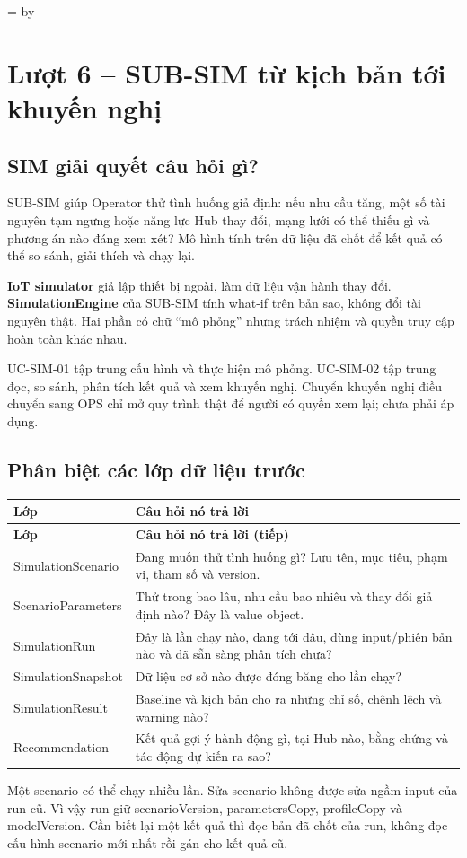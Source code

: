 \documentclass[12pt,a4paper]{article}
\newcommand{\Needspace}[1]{%
  \par\begingroup\dimen0=\pagegoal\advance\dimen0 by -\pagetotal
  \ifdim\dimen0<#1\relax\newpage\fi\endgroup}
\newcommand{\Lesson}[1]{\par\bigskip\Needspace{0.52\textheight}\section{#1}}
\newcommand{\Term}[1]{\textbf{#1}}
\newenvironment{PairTable}[2]{%
  \begin{longtable}{|L{39mm}|L{106mm}|}\hline
  \textbf{#1} & \textbf{#2}\\\hline\endfirsthead
  \hline\textbf{#1} & \textbf{#2 (tiếp)}\\\hline\endhead
}{\end{longtable}}
\begin{document}
\Lesson{Lượt 6 -- SUB-SIM từ kịch bản tới khuyến nghị}
\subsection{SIM giải quyết câu hỏi gì?}
SUB-SIM giúp Operator thử tình huống giả định: nếu nhu cầu tăng, một số tài nguyên tạm ngưng hoặc năng lực Hub thay đổi, mạng lưới có thể thiếu gì và phương án nào đáng xem xét? Mô hình tính trên dữ liệu đã chốt để kết quả có thể so sánh, giải thích và chạy lại.

\Term{IoT simulator} giả lập thiết bị ngoài, làm dữ liệu vận hành thay đổi. \Term{SimulationEngine} của SUB-SIM tính what-if trên bản sao, không đổi tài nguyên thật. Hai phần có chữ ``mô phỏng'' nhưng trách nhiệm và quyền truy cập hoàn toàn khác nhau.

UC-SIM-01 tập trung cấu hình và thực hiện mô phỏng. UC-SIM-02 tập trung đọc, so sánh, phân tích kết quả và xem khuyến nghị. Chuyển khuyến nghị điều chuyển sang OPS chỉ mở quy trình thật để người có quyền xem lại; chưa phải áp dụng.

\subsection{Phân biệt các lớp dữ liệu trước}
\begin{PairTable}{Lớp}{Câu hỏi nó trả lời}
SimulationScenario & Đang muốn thử tình huống gì? Lưu tên, mục tiêu, phạm vi, tham số và version.\\\hline
ScenarioParameters & Thử trong bao lâu, nhu cầu bao nhiêu và thay đổi giả định nào? Đây là value object.\\\hline
SimulationRun & Đây là lần chạy nào, đang tới đâu, dùng input/phiên bản nào và đã sẵn sàng phân tích chưa?\\\hline
SimulationSnapshot & Dữ liệu cơ sở nào được đóng băng cho lần chạy?\\\hline
SimulationResult & Baseline và kịch bản cho ra những chỉ số, chênh lệch và warning nào?\\\hline
Recommendation & Kết quả gợi ý hành động gì, tại Hub nào, bằng chứng và tác động dự kiến ra sao?\\\hline
\end{PairTable}

Một scenario có thể chạy nhiều lần. Sửa scenario không được sửa ngầm input của run cũ. Vì vậy run giữ scenarioVersion, parametersCopy, profileCopy và modelVersion. Cần biết lại một kết quả thì đọc bản đã chốt của run, không đọc cấu hình scenario mới nhất rồi gán cho kết quả cũ.
\end{document}
